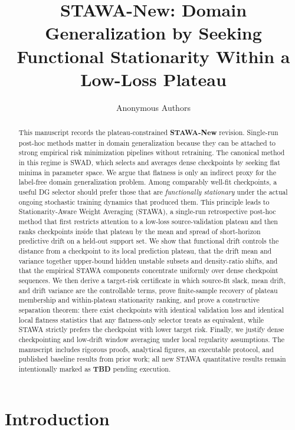 \documentclass{article}
\title{STAWA-New: Domain Generalization by Seeking Functional Stationarity Within a Low-Loss Plateau}
\author{Anonymous Authors}
\newcommand{\TBD}{\textbf{TBD}}
\newcommand{\stawa}{\textup{\textsc{STAWA}}}
\newcommand{\swad}{\textup{\textsc{SWAD}}}
\begin{document}
\maketitle

\begin{abstract}
This manuscript records the plateau-constrained \textbf{STAWA-New} revision.
Single-run post-hoc methods matter in domain generalization because they can be attached to strong empirical risk minimization pipelines without retraining. The canonical method in this regime is \swad, which selects and averages dense checkpoints by seeking flat minima in parameter space. We argue that flatness is only an indirect proxy for the label-free domain generalization problem. Among comparably well-fit checkpoints, a useful DG selector should prefer those that are \emph{functionally stationary} under the actual ongoing stochastic training dynamics that produced them. This principle leads to Stationarity-Aware Weight Averaging (\stawa), a single-run retrospective post-hoc method that first restricts attention to a low-loss source-validation plateau and then ranks checkpoints inside that plateau by the mean and spread of short-horizon predictive drift on a held-out support set. We show that functional drift controls the distance from a checkpoint to its local prediction plateau, that the drift mean and variance together upper-bound hidden unstable subsets and density-ratio shifts, and that the empirical \stawa{} components concentrate uniformly over dense checkpoint sequences. We then derive a target-risk certificate in which source-fit slack, mean drift, and drift variance are the controllable terms, prove finite-sample recovery of plateau membership and within-plateau stationarity ranking, and prove a constructive separation theorem: there exist checkpoints with identical validation loss and identical local flatness statistics that any flatness-only selector treats as equivalent, while \stawa{} strictly prefers the checkpoint with lower target risk. Finally, we justify dense checkpointing and low-drift window averaging under local regularity assumptions. The manuscript includes rigorous proofs, analytical figures, an executable protocol, and published baseline results from prior work; all new \stawa{} quantitative results remain intentionally marked as \TBD{} pending execution.
\end{abstract}

\section{Introduction}
\end{document}
